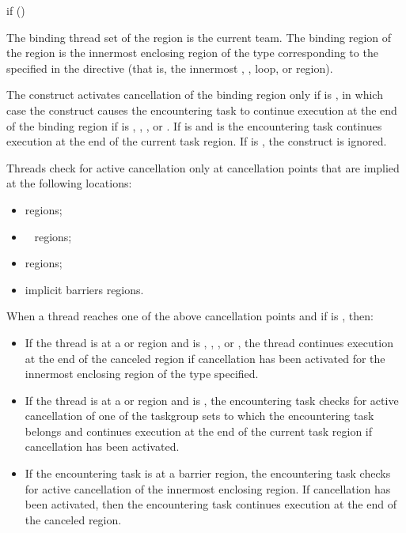 \begin{indentedcodelist}
if ()
\end{indentedcodelist}
\fortranspecificend

\binding
The binding thread set of the  region is the current team.
The binding region of the  region 
is the innermost enclosing region of the type corresponding to the  
specified in the directive (that is, the innermost , , loop, or 
 region).

\descr
The  construct activates cancellation of the binding region only if  
is , in which case the  construct causes the encountering task to continue execution 
at the end of the binding region if  is , , , or . 
If  is  and  is  the encountering task continues execution at the end of the current task region.
If  is , the  construct is 
ignored.

Threads check for active cancellation only at cancellation points that are 
implied at the following locations:

\begin{itemize}
\item {} regions; 
\item {}~ regions;
\item {} regions;
\item implicit barriers regions.
\end{itemize}

When a thread reaches one of the above cancellation points and if  is ,  then:
\begin{itemize}
\item If the thread is at a  or  region 
and  is , , , or 
, the thread continues execution at the end of the canceled 
region if cancellation has been activated for the innermost enclosing region 
of the type specified.

\item If the thread is at a  or  region 
and  is , the encountering task 
checks for active cancellation of one of the taskgroup sets to which the 
encountering task belongs and continues execution at the end of the current 
task region if cancellation has been activated.

\item If the encountering task is at a barrier region, the encountering task 
checks for active cancellation of the innermost enclosing  
region. If cancellation has been activated, then the encountering task 
continues execution at the end of the canceled region.
\end{itemize}

